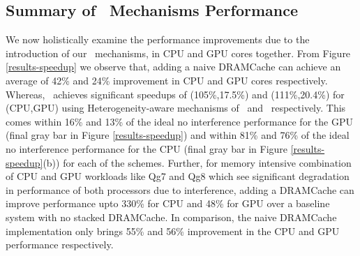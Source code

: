 \subsection{Summary of \cachename\ Mechanisms Performance}
We now holistically examine the performance improvements due to the introduction of our \cachename\ mechanisms, in  CPU and GPU cores together. From Figure \ref{results-speedup} we observe that, adding a naive DRAMCache can achieve an average of 42\% and 24\% improvement in CPU and GPU cores respectively. Whereas, \cachename\ achieves significant speedups of (105\%,17.5\%) and (111\%,20.4\%) for (CPU,GPU) using Heterogeneity-aware mechanisms of \bypassname\ and \chaining\ respectively. This comes within 16\% and 13\% of the ideal no interference performance for the GPU (final gray bar in Figure \ref{results-speedup}) and within 81\% and 76\% of the ideal no interference performance for the CPU (final gray bar in Figure \ref{results-speedup}(b)) for each of the schemes. Further, for memory intensive combination of CPU and GPU workloads like Qg7 and Qg8 which see significant degradation in performance of both processors due to interference, adding a DRAMCache can improve performance upto 330\% for CPU and 48\% for GPU over a baseline system with no stacked DRAMCache. In comparison, the naive DRAMCache implementation only brings 55\% and 56\% improvement in the CPU and GPU performance respectively.

